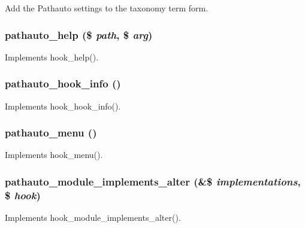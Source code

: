 Add the Pathauto settings to the taxonomy term form. \hypertarget{pathauto_8module_aa633ee0b08bc28c487cd4f3c21f7a001}{
\subsubsection[{pathauto\_\-help}]{\setlength{\rightskip}{0pt plus 5cm}pathauto\_\-help (\$ {\em path}, \/  \$ {\em arg})}}
\label{pathauto_8module_aa633ee0b08bc28c487cd4f3c21f7a001}
Implements hook\_\-help(). \hypertarget{pathauto_8module_aec3433593badeba9c5f6d72c727c0850}{
\subsubsection[{pathauto\_\-hook\_\-info}]{\setlength{\rightskip}{0pt plus 5cm}pathauto\_\-hook\_\-info ()}}
\label{pathauto_8module_aec3433593badeba9c5f6d72c727c0850}
Implements hook\_\-hook\_\-info(). \hypertarget{pathauto_8module_a32103de2e3a1451e5396ef6d7bb0b53e}{
\subsubsection[{pathauto\_\-menu}]{\setlength{\rightskip}{0pt plus 5cm}pathauto\_\-menu ()}}
\label{pathauto_8module_a32103de2e3a1451e5396ef6d7bb0b53e}
Implements hook\_\-menu(). \hypertarget{pathauto_8module_aaf87f3ee5c92db465e39a83dafc7e470}{
\subsubsection[{pathauto\_\-module\_\-implements\_\-alter}]{\setlength{\rightskip}{0pt plus 5cm}pathauto\_\-module\_\-implements\_\-alter (\&\$ {\em implementations}, \/  \$ {\em hook})}}
\label{pathauto_8module_aaf87f3ee5c92db465e39a83dafc7e470}
Implements hook\_\-module\_\-implements\_\-alter().

